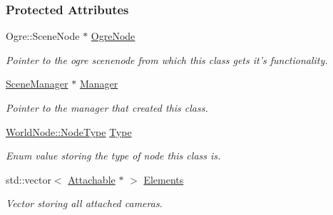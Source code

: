 \subsubsection*{Protected Attributes}
\begin{DoxyCompactItemize}
\item 
\hypertarget{classphys_1_1WorldNode_abc3e4ddcd1dc2f15ffa40ed2d18b5fd8}{
Ogre::SceneNode $\ast$ \hyperlink{classphys_1_1WorldNode_abc3e4ddcd1dc2f15ffa40ed2d18b5fd8}{OgreNode}}
\label{d2/d3e/classphys_1_1WorldNode_abc3e4ddcd1dc2f15ffa40ed2d18b5fd8}

\begin{DoxyCompactList}\small\item\em Pointer to the ogre scenenode from which this class gets it's functionality. \item\end{DoxyCompactList}\item 
\hypertarget{classphys_1_1WorldNode_a070f1686f70880dac0241c96518c7a8a}{
\hyperlink{classphys_1_1SceneManager}{SceneManager} $\ast$ \hyperlink{classphys_1_1WorldNode_a070f1686f70880dac0241c96518c7a8a}{Manager}}
\label{d2/d3e/classphys_1_1WorldNode_a070f1686f70880dac0241c96518c7a8a}

\begin{DoxyCompactList}\small\item\em Pointer to the manager that created this class. \item\end{DoxyCompactList}\item 
\hypertarget{classphys_1_1WorldNode_aef2329f38799c3d67f1f1f69b35dda20}{
\hyperlink{classphys_1_1WorldNode_a0b178b06aa411b00c4c2ccd926d9bf5a}{WorldNode::NodeType} \hyperlink{classphys_1_1WorldNode_aef2329f38799c3d67f1f1f69b35dda20}{Type}}
\label{d2/d3e/classphys_1_1WorldNode_aef2329f38799c3d67f1f1f69b35dda20}

\begin{DoxyCompactList}\small\item\em Enum value storing the type of node this class is. \item\end{DoxyCompactList}\item 
\hypertarget{classphys_1_1WorldNode_a2a17c53f3a7ad3d5bd322855096fcbc3}{
std::vector$<$ \hyperlink{classphys_1_1Attachable}{Attachable} $\ast$ $>$ \hyperlink{classphys_1_1WorldNode_a2a17c53f3a7ad3d5bd322855096fcbc3}{Elements}}
\label{d2/d3e/classphys_1_1WorldNode_a2a17c53f3a7ad3d5bd322855096fcbc3}

\begin{DoxyCompactList}\small\item\em Vector storing all attached cameras. \item\end{DoxyCompactList}\end{DoxyCompactItemize}


